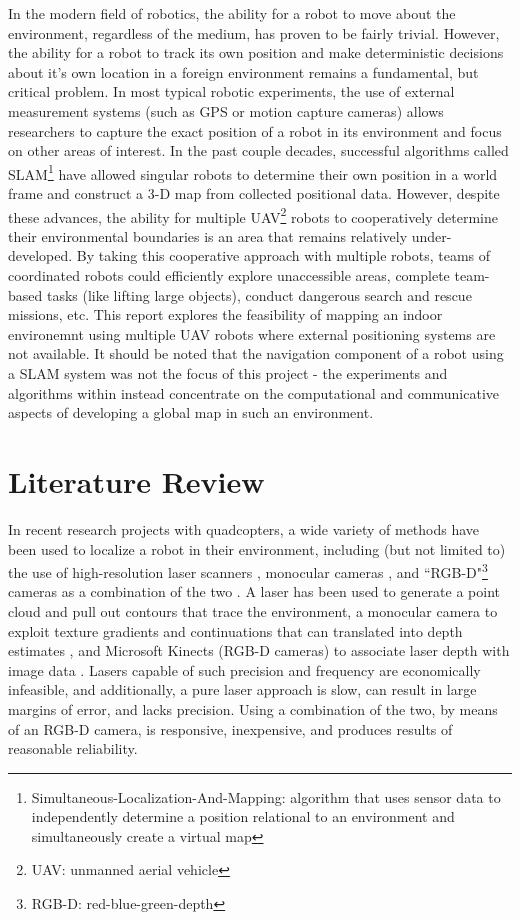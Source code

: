 \documentclass[letterpaper, oneside, 10pt]{report}
\begin{document}
In the modern field of robotics, the ability for a robot to move about the environment, regardless of the medium, has proven to be fairly trivial. However, the ability for a robot to track its own position and make deterministic decisions about it's own location in a foreign environment remains a fundamental, but critical problem. In most typical robotic experiments, the use of external measurement systems (such as GPS or motion capture cameras) allows researchers to capture the exact position of a robot in its environment and focus on other areas of interest. In the past couple decades, successful algorithms called SLAM\footnote{Simultaneous-Localization-And-Mapping: algorithm that uses sensor data to independently determine a position relational to an environment and simultaneously create a virtual map} have allowed singular robots to determine their own position in a world frame and construct a 3-D map from collected positional data. However, despite these advances, the ability for multiple UAV\footnote{UAV: unmanned aerial vehicle} robots to cooperatively determine their environmental boundaries is an area that remains relatively under-developed. By taking this cooperative approach with multiple robots, teams of coordinated robots could efficiently explore unaccessible areas, complete team-based tasks (like lifting large objects), conduct dangerous search and rescue missions, etc. This report explores the feasibility of mapping an indoor environemnt using multiple UAV robots where external positioning systems are not available. It should be noted that the navigation component of a robot using a SLAM system was not the focus of this project - the experiments and algorithms within instead concentrate on the computational and communicative aspects of developing a global map in such an environment.

\section{Literature Review}

In recent research projects with quadcopters, a wide variety of methods have been used to localize a robot in their environment, including (but not limited to) the use of high-resolution laser scanners \cite{bachrach2011range,shen2011autonomous}, monocular cameras \cite{soundararaj2009autonomous}, and ``RGB-D"\footnote{RGB-D: red-blue-green-depth} cameras as a combination of the two \cite{huang2011visual}. A laser has been used to generate a point cloud and pull out contours that trace the environment\cite{bachrach2011range}, a monocular camera to exploit texture gradients and continuations that can translated into depth estimates \cite{soundararaj2009autonomous}, and Microsoft Kinects (RGB-D cameras) to associate laser depth with image data \cite{huang2011visual}. Lasers capable of such precision and frequency are economically infeasible, and additionally, a pure laser approach is slow, can result in large margins of error, and lacks precision. Using a combination of the two, by means of an RGB-D camera, is responsive,  inexpensive, and produces results of reasonable reliability.
\end{document}
